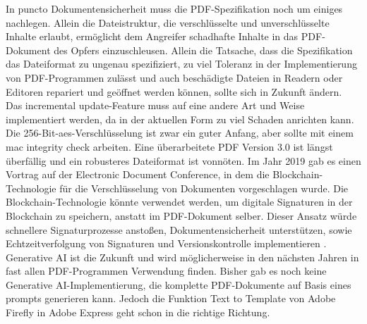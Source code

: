 In puncto Dokumentensicherheit muss die PDF-Spezifikation noch um einiges nachlegen. Allein die Dateistruktur, die verschlüsselte und unverschlüsselte Inhalte erlaubt, ermöglicht dem Angreifer schadhafte Inhalte in das PDF-Dokument des Opfers einzuschleusen. Allein die Tatsache, dass die Spezifikation das Dateiformat zu ungenau spezifiziert, zu viel Toleranz in der Implementierung von PDF-Programmen zulässt und auch beschädigte Dateien in Readern oder Editoren repariert und geöffnet werden können, sollte sich in Zukunft ändern. Das incremental update-Feature muss auf eine andere Art und Weise implementiert werden, da in der aktuellen Form zu viel Schaden anrichten kann. Die 256-Bit-\gls{aes}-Verschlüsselung ist zwar ein guter Anfang, aber sollte mit einem \gls{mac} integrity check arbeiten. Eine überarbeitete PDF Version 3.0 ist längst überfällig und ein robusteres Dateiformat ist vonnöten. Im Jahr 2019 gab es einen Vortrag auf der Electronic Document Conference, in dem die Blockchain-Technologie für die Verschlüsselung von Dokumenten vorgeschlagen wurde. Die Blockchain-Technologie könnte verwendet werden, um digitale Signaturen in der Blockchain zu speichern, anstatt im PDF-Dokument selber. Dieser Ansatz würde schnellere Signaturprozesse anstoßen, Dokumentensicherheit unterstützen, sowie Echtzeitverfolgung von Signaturen und Versionskontrolle implementieren \cite{pdf-association-blockchain}. Generative AI ist die Zukunft und wird möglicherweise in den nächsten Jahren in fast allen PDF-Programmen Verwendung finden. Bisher gab es noch keine Generative AI-Implementierung, die komplette PDF-Dokumente auf Basis eines prompts generieren kann. Jedoch die Funktion Text to Template von Adobe Firefly in Adobe Express geht schon in die richtige Richtung. 